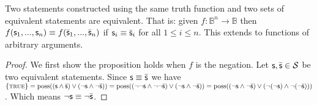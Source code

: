 \documentclass[11pt,letterpaper,fleqn]{memoir} %
\begin{document}
\begin{mathSection}
	
	\begin{prop}
		Two statements constructed using the same truth function and two sets of equivalent statements are equivalent. That is: given $f : \mathbb{B}^n \to \mathbb{B}$ then $f(\mathsf{s}_1, ..., \mathsf{s}_n) \equiv f(\bar{\mathsf{s}}_1, ..., \bar{\mathsf{s}}_n)$ if $\mathsf{s}_i \equiv \bar{\mathsf{s}}_i$ for all $1 \leq i \leq n$. This extends to functions of arbitrary arguments.
	\end{prop}
	\begin{proof}
		We first show the proposition holds when $f$ is the negation. Let $\mathsf{s}, \bar{\mathsf{s}} \in \mathcal{S}$ be two equivalent statements. Since $\mathsf{s} \equiv \bar{\mathsf{s}}$ we have $\{\textsc{true}\} = \operatorname{poss}((\mathsf{s} \wedge \bar{\mathsf{s}}) \vee (\neg \mathsf{s} \wedge \neg \bar{\mathsf{s}})) = \operatorname{poss}((\neg \neg \mathsf{s} \wedge \neg \neg \bar{\mathsf{s}}) \vee (\neg \mathsf{s} \wedge \neg \bar{\mathsf{s}})) = \operatorname{poss}((\neg \mathsf{s} \wedge \neg \bar{\mathsf{s}}) \vee (\neg (\neg \mathsf{s}) \wedge \neg (\neg \bar{\mathsf{s}})))$. Which means  $\neg \mathsf{s} \equiv \neg \bar{\mathsf{s}}$.
		

\end{proof}
\end{mathSection}
\end{document}
